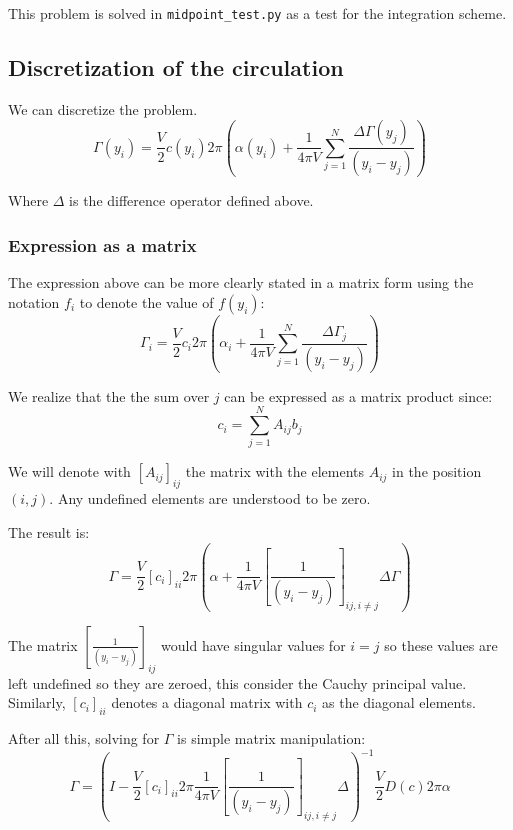 This problem is solved in \texttt{midpoint\_test.py} as a test for the integration scheme.

\subsection{Discretization of the circulation}
We can discretize the problem.
\begin{equation}
    \Gamma(y_i) = \frac{V}{2} c(y_i) 2 \pi \left( \alpha(y_i) + \frac{1}{4\pi V}\sum_{j=1}^{N} \frac{\Delta\Gamma(y_j)}{\left(y_i - y_j\right)} \right)
\end{equation}

Where $\Delta$ is the difference operator defined above.

\subsubsection{Expression as a matrix}
The expression above can be more clearly stated in a matrix form using the notation $f_i$ to denote the value of $f(y_i)$:
\begin{equation}
    \Gamma_i = \frac{V}{2} c_i 2 \pi \left( \alpha_i + \frac{1}{4\pi V}\sum_{j=1}^{N} \frac{\Delta\Gamma_j}{\left(y_i - y_j\right)} \right)
\end{equation}

We realize that the the sum over $j$ can be expressed as a matrix product since:
\begin{equation}
    c_i = \sum_{j=1}^{N} A_{ij}b_j
\end{equation}

We will denote with $\left[A_{ij}\right]_{ij}$ the matrix with the elements $A_{ij}$ in the position $(i,j)$. Any undefined elements are understood to be zero.

The result is:
\begin{equation}
    \Gamma= \frac{V}{2} \left[c_i\right]_{ii} 2 \pi \left( \alpha + \frac{1}{4\pi V} \left[\frac{1}{\left(y_i - y_j\right)}\right]_{ij,i\neq j}\Delta\Gamma \right)
\end{equation}

The matrix $\left[\frac{1}{\left(y_i - y_j\right)}\right]_{ij}$ would have singular values for $i=j$ so these values are left undefined so they are zeroed, this consider the Cauchy principal value. Similarly, $\left[c_i\right]_{ii}$ denotes a diagonal matrix with $c_i$ as the diagonal elements.

After all this, solving for  $\Gamma$ is simple matrix manipulation:
\begin{equation}
    \Gamma = \left(I- \frac{V}{2} \left[c_i\right]_{ii} 2 \pi \frac{1}{4\pi V} \left[\frac{1}{\left(y_i - y_j\right)}\right]_{ij,i\neq j}\Delta \right)^{-1} \frac{V}{2} D(c) 2 \pi \alpha
\end{equation}

